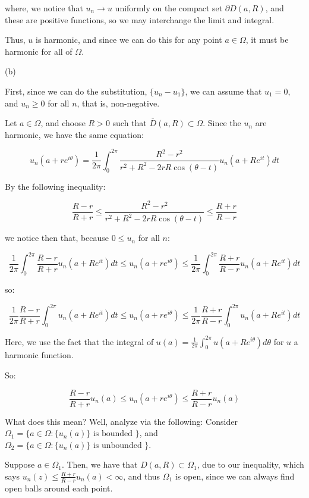 \documentclass[10pt]{article}
\begin{document}
where, we notice that $u_n \to u$ uniformly on the compact set $\partial D(a,R)$, and these are positive functions, so we may interchange the limit and integral. 

Thus, $u$ is harmonic, and since we can do this for any point $a \in \Omega$, it must be harmonic for all of $\Omega$. 

(b)

First, since we can do the substitution, $\{ u_n - u_1 \}$, we can assume that $u_1 = 0$, and $u_n \geq 0$ for all $n$, that is, non-negative. 

Let $a \in \Omega$, and choose $R >0$ such that $\overline{D}(a,R) \subset \Omega$. Since the $u_n$ are harmonic, we have the same equation:

$$u_n(a + re^{i\theta}) = \frac{1}{2\pi} \int_0^{2\pi}  \frac{R^2 - r^2}{r^2 + R^2 - 2rR \cos(\theta - t)} u_n(a + Re^{it}) dt$$

By the following inequality:

$$\frac{R-r}{R+r} \leq \frac{R^2 - r^2}{r^2 + R^2 - 2rR \cos(\theta - t)}  \leq \frac{R + r}{R - r}$$

we notice then that, because $0 \leq u_n$ for all $n$:

$$\frac{1}{2\pi} \int_0^{2\pi}  \frac{R - r}{R + r}  u_n(a + Re^{it}) dt \leq u_n(a + re^{i\theta}) \leq \frac{1}{2\pi} \int_0^{2\pi}  \frac{R + r}{R - r}  u_n(a + Re^{it}) dt$$

so:

$$\frac{1}{2\pi} \frac{R - r}{R + r} \int_0^{2\pi} u_n(a + Re^{it}) dt \leq u_n(a + re^{i\theta}) \leq \frac{1}{2\pi} \frac{R + r}{R - r} \int_0^{2\pi}   u_n(a + Re^{it}) dt$$

Here, we use the fact that the integral of $u(a) = \frac{1}{2\pi} \int_0^{2\pi} u(a + Re^{i\theta}) d\theta$ for $u$ a harmonic function.

So:

$$ \frac{R - r}{R + r} u_n(a) \leq u_n(a + re^{i\theta}) \leq \frac{R + r}{R - r} u_n(a) $$

What does this mean? Well, analyze via the following: Consider $\Omega_1 = \{ a \in \Omega : \{ u_n(a) \} \text{ is bounded } \}$, and $\Omega_2 =  \{ a \in \Omega : \{ u_n(a) \} \text{ is unbounded } \}$.

Suppose $a \in \Omega_1$. Then, we have that $D(a,R) \subset \Omega_1$, due to our inequality, which says $u_n(z) \leq \frac{R + r}{R - r} u_n(a) < \infty$, and thus $\Omega_1$ is open, since we can always find open balls around each point.
\end{document}
